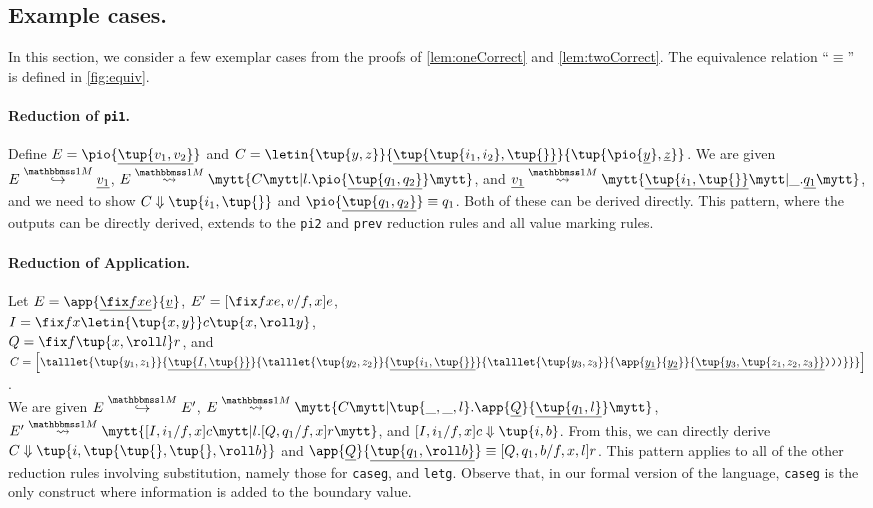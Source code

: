 \begin{abstrsyn}
\subsection{Example cases.}

In this section, we consider a few exemplar cases 
from the proofs of \ref{lem:oneCorrect} and \ref{lem:twoCorrect}.
The equivalence relation ``$\equiv$'' is defined in \ref{fig:equiv}.

\paragraph{Reduction of {\tt pi1}.}
Define $E = \pio {\exv{\tup {v_1,v_2}}}$ and  
$C = \letin{\tup{y,z}}{\exv{\tup{\tup {i_1,i_2},\tup{}}}}{\tup{\pio {\exv y},\exv z}}$.
We are given $\stepmix  E {\exv {v_1}}$,
$\splitone E A C {l.\pio {\exv {\tup{q_1,q_2}}}}$, and
$\splitone {\exv {v_1}} A {\exv {\tup{i_1,\tup{}}}} {\_.\exv{q_1}}$,
and we need to show $\reduce C {\tup {i_1,\tup{}}}$
and $\pio {\exv {\tup{q_1,q_2}}} \equiv q_1$.
Both of these can be derived directly.
This pattern, where the outputs can be directly derived, extends to the {\tt pi2} and {\tt prev} reduction rules and all value marking rules.

\paragraph{Reduction of Application.} Let $E = \app {\exv{\fix f x e}} {\exv v}$,
$E' = [\fix fxe, v/f,x] e$, \\ 
$I = \fix f x {\letin {\tup{x,y}} c {\tup{x,\roll y}}}$, \\
$Q = \fix f {\tup{x,\roll l}} r$, and \\
$C = \left[
\talllet{\tup{y_1,z_1}}{\exv {\tup {I,\tup{}}}}{
\talllet{\tup{y_2,z_2}} {\exv {\tup {i_1,\tup{}}}}{
\talllet{\tup{y_3,z_3}}{\app{\exv {y_1}}{\exv {y_2}}}{\exv{\tup{y_3,\tup{z_1,z_2,z_3}}}\ttrpar\ttrpar\ttrpar}}}\right]$.
\\
We are given $\stepmix E {E'}$,
$\splitone E A C {\tup{\_,\_,l}.\app{\exv Q}{\exv{\tup{q_1,l}}}}$,
$\splitone {E'} A {[I,i_1/f,x]c} {l.[Q,q_1/f,x]r}$,
and $\reduce {[I,i_1/f,x]c} {\tup{i,b}}$.
From this, we can directly derive $\reduce C {\tup{i,\tup {\tup{},\tup{},\roll b}}}$
and $\app{\exv Q}{\exv{\tup{q_1,\roll b}}} \equiv [Q,q_1,b/f,x,l] r$.
This pattern applies to all of the other reduction rules involving substitution,
namely those for {\tt caseg}, and {\tt letg}. 
Observe that, in our formal version of the language, 
{\tt caseg} is the only construct where information is added to the boundary value.


\end{abstrsyn}
